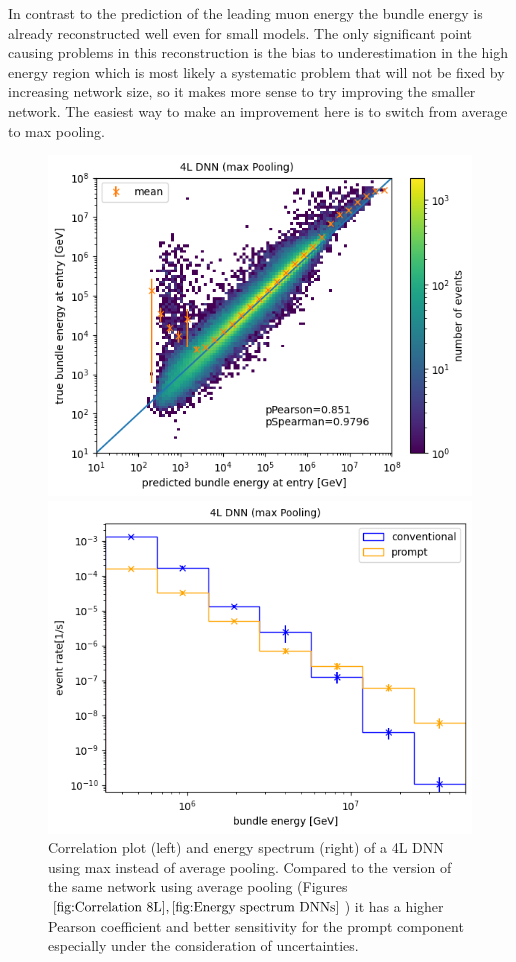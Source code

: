 \documentclass[
  tucolor,       %
  BCOR=12mm,     %
  parskip=half,  %
  open=any,      %
  cleardoublepage=plain,  %
]{tudothesis}
\begin{document}
In contrast to the prediction of the leading muon energy the bundle energy is already reconstructed well even for small models. The only significant point causing problems in this reconstruction is the bias to underestimation in the high energy region which is most likely a systematic problem that will not be fixed by increasing network size, so it makes more sense to try improving the smaller network.
The easiest way to make an improvement here is to switch from average to max pooling.
\begin{figure}
  \centering
  \begin{minipage}[t]{0.49\textwidth}
    \includegraphics[width=\textwidth]{Plots/Correlation bundle 4L max}
  \end{minipage}
  \begin{minipage}[t]{0.49\textwidth}
    \includegraphics[width=\textwidth]{Plots/muon flux 4L max}
  \end{minipage}
  \caption{Correlation plot (left) and energy spectrum (right) of a 4L DNN using max instead of average pooling. Compared to the version of the same network using average pooling (Figures $\ref{fig:Correlation 8L},\ref{fig:Energy spectrum DNNs}$) it has a higher Pearson coefficient and better sensitivity for the prompt component especially under the consideration of uncertainties.}
  \label{fig:4L max}
\end{figure}
\end{document}
